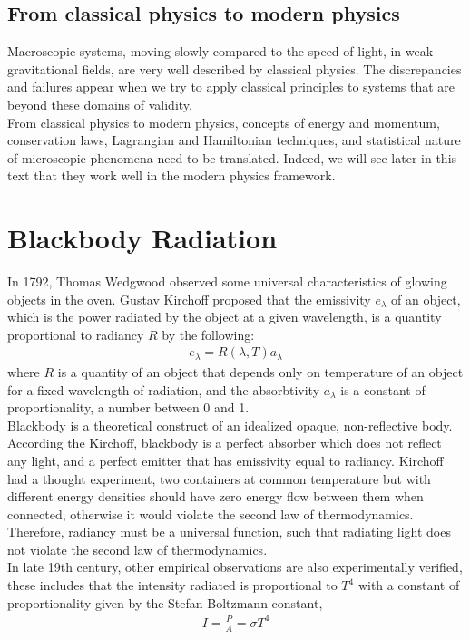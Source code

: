 \documentclass[11pt]{article}
\theoremstyle{break}
\theoremstyle{break}
\begin{document}
\subsection{From classical physics to modern physics}
Macroscopic systems, moving slowly compared to the speed of light, in weak gravitational fields, are very well described by classical physics. The discrepancies and failures appear when we try to apply classical principles to systems that are beyond these domains of validity.\\

From classical physics to modern physics, concepts of energy and momentum, conservation laws, Lagrangian and Hamiltonian techniques, and statistical nature of microscopic phenomena need to be translated. Indeed, we will see later in this text that they work well in the modern physics framework.\\

\newpage
\section{Blackbody Radiation}
In 1792, Thomas Wedgwood observed some universal characteristics of glowing objects in the oven. Gustav Kirchoff proposed that the emissivity $e_\lambda$ of an object, which is the power radiated by the object at a given wavelength, is a quantity proportional to radiancy $R$ by the following:
\begin{align*}
e_\lambda = R(\lambda, T) a_\lambda
\end{align*}
where $R$ is a quantity of an object that depends only on temperature of an object for a fixed wavelength of radiation, and the absorbtivity $a_\lambda$ is a constant of proportionality, a number between 0 and 1. \\

Blackbody is a theoretical construct of an idealized opaque, non-reflective body. According the Kirchoff, blackbody is a perfect absorber which does not reflect any light, and a perfect emitter that has emissivity equal to radiancy. Kirchoff had a thought experiment, two containers at common temperature but with different energy densities should have zero energy flow between them when connected, otherwise it would violate the second law of thermodynamics. Therefore, radiancy must be a universal function, such that radiating light does not violate the second law of thermodynamics. \\

In late 19th century, other empirical observations are also experimentally verified, these includes that the intensity radiated is proportional to $T^4$ with a constant of proportionality given by the Stefan-Boltzmann constant, 
\begin{align}
I = \frac{P}{A} = \sigma T^4 
\end{align}
\end{document}
